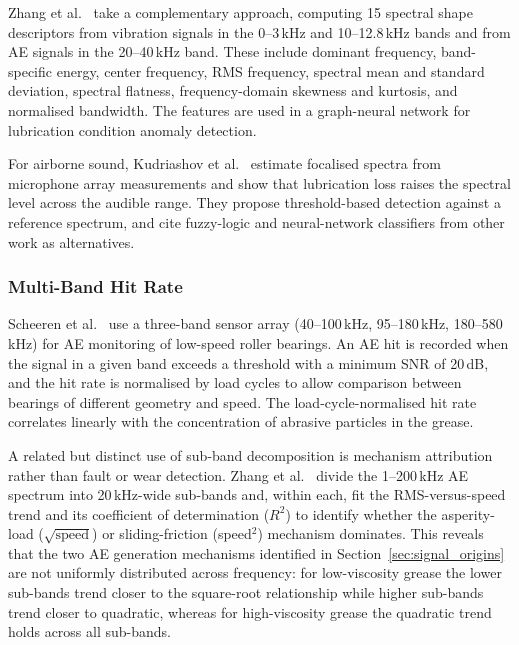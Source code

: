 Zhang et al.\ \cite{zhang_graph-data-based_2024} take a complementary approach, computing 15 spectral shape descriptors from vibration signals in the 0--3\,kHz and 10--12.8\,kHz bands and from AE signals in the 20--40\,kHz band. These include dominant frequency, band-specific energy, center frequency, RMS frequency, spectral mean and standard deviation, spectral flatness, frequency-domain skewness and kurtosis, and normalised bandwidth. The features are used in a graph-neural network for lubrication condition anomaly detection.

For airborne sound, Kudriashov et al.\ \cite{georgiev_microphone_2017} estimate focalised spectra from microphone array measurements and show that lubrication loss raises the spectral level across the audible range. They propose threshold-based detection against a reference spectrum, and cite fuzzy-logic and neural-network classifiers from other work as alternatives.

\subsubsection{Multi-Band Hit Rate}
\label{subsubsec:hitrate}
Scheeren et al.\ \cite{delft_university_of_technology_tu_delft_influence_2024} use a three-band sensor array (40--100\,kHz, 95--180\,kHz, 180--580\,kHz) for AE monitoring of low-speed roller bearings. An AE hit is recorded when the signal in a given band exceeds a threshold with a minimum SNR of 20\,dB, and the hit rate is normalised by load cycles to allow comparison between bearings of different geometry and speed. The load-cycle-normalised hit rate correlates linearly with the concentration of abrasive particles in the grease.

A related but distinct use of sub-band decomposition is mechanism attribution rather than fault or wear detection. Zhang et al.\ \cite{zhang_coupled_2026} divide the 1--200\,kHz AE spectrum into 20\,kHz-wide sub-bands and, within each, fit the RMS-versus-speed trend and its coefficient of determination ($R^2$) to identify whether the asperity-load ($\sqrt{\text{speed}}$) or sliding-friction (speed$^2$) mechanism dominates. This reveals that the two AE generation mechanisms identified in Section~\ref{sec:signal_origins} are not uniformly distributed across frequency: for low-viscosity grease the lower sub-bands trend closer to the square-root relationship while higher sub-bands trend closer to quadratic, whereas for high-viscosity grease the quadratic trend holds across all sub-bands.

